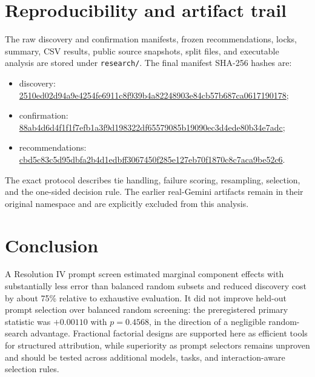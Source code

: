 \documentclass[11pt,a4paper]{article}
\begin{document}
\section{Reproducibility and artifact trail}

The raw discovery and confirmation manifests, frozen recommendations, locks, summary, CSV results, public source snapshots, split files, and executable analysis are stored under \texttt{research/}. The final manifest SHA-256 hashes are:
\begingroup\scriptsize
\begin{itemize}[leftmargin=*]
\item discovery: \url{2510ed02d94a9e4254fe6911c8f939b4a82248903e84cb57b687ca0617190178};
\item confirmation: \url{88ab4d6d4f1f1f7efb1a3f9d198322df65579085b19090ec3d4ede80b34e7adc};
\item recommendations: \url{cbd5c83c5d95dbfa2b4d1edbff3067450f285e127eb70f1870c8c7aca9be52c6}.
\end{itemize}
\endgroup
The exact protocol describes tie handling, failure scoring, resampling, selection, and the one-sided decision rule. The earlier real-Gemini artifacts remain in their original namespace and are explicitly excluded from this analysis.

\section{Conclusion}

A Resolution IV prompt screen estimated marginal component effects with substantially less error than balanced random subsets and reduced discovery cost by about 75\% relative to exhaustive evaluation. It did not improve held-out prompt selection over balanced random screening: the preregistered primary statistic was $+0.00110$ with $p=0.4568$, in the direction of a negligible random-search advantage. Fractional factorial designs are supported here as efficient tools for structured attribution, while superiority as prompt selectors remains unproven and should be tested across additional models, tasks, and interaction-aware selection rules.



\end{document}
